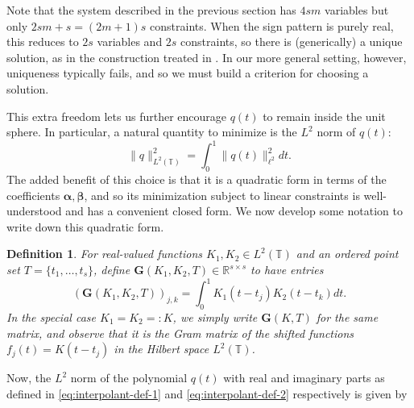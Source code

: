 \documentclass[11pt]{article}
\newcommand{\RR}{\mathbb{R}}
\newcommand{\TT}{\mathbb{T}}
\newcommand{\balpha}{\bm \alpha}
\newcommand{\bbeta}{\bm \beta}
\newcommand{\bG}{\bm G}
\newtheorem{definition}{Definition}
\begin{document}
Note that the system described in the previous section has $4sm$ variables but only $2sm + s = (2m + 1)s$ constraints.
When the sign pattern is purely real, this reduces to $2s$ variables and $2s$ constraints, so there is (generically) a unique solution, as in the construction treated in \cite{fernandez2016super}.
In our more general setting, however, uniqueness typically fails, and so we must build a criterion for choosing a solution.

This extra freedom lets us further encourage $q(t)$ to remain inside the unit sphere.
In particular, a natural quantity to minimize is the $L^2$ norm of $q(t)$:
\begin{equation}
    \|q\|_{L^2(\TT)}^2 = \int_0^1 \|q(t)\|_{\ell^2}^2 dt.
\end{equation}
The added benefit of this choice is that it is a quadratic form in terms of the coefficients $\balpha, \bbeta$, and so its minimization subject to linear constraints is well-understood and has a convenient closed form.
We now develop some notation to write down this quadratic form.
\begin{definition}
    For real-valued functions $K_1, K_2 \in L^2(\TT)$ and an ordered point set $T = \{t_1, \dots, t_s\}$, define $\bG(K_1, K_2, T) \in \RR^{s \times s}$ to have entries
    \begin{equation}
        (\bG(K_1, K_2, T))_{j, k} = \int_0^1 K_1(t - t_j)K_2(t - t_k)dt.
    \end{equation}
  In the special case $K_1 = K_2 =: K$, we simply write $\bG(K, T)$ for the same matrix, and observe that it is the Gram matrix of the shifted functions $f_j(t) = K(t - t_j)$ in the Hilbert space $L^2(\TT)$.
\end{definition}
Now, the $L^2$ norm of the polynomial $q(t)$ with real and imaginary parts as defined in \eqref{eq:interpolant-def-1} and \eqref{eq:interpolant-def-2} respectively is given by
\end{document}

